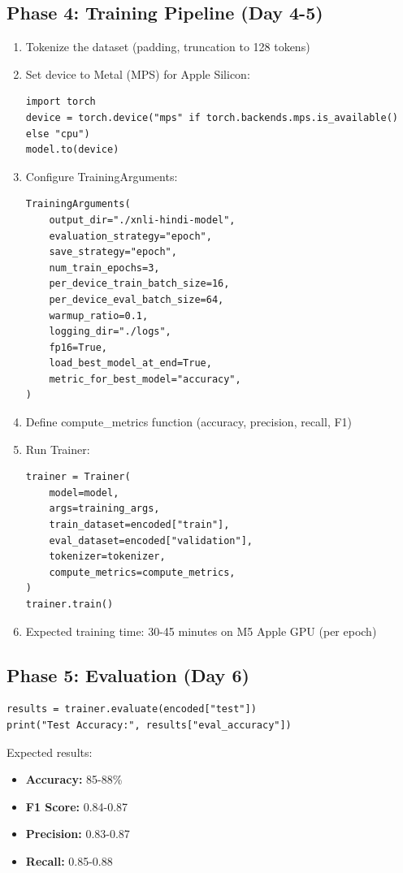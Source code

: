 \subsection{Phase 4: Training Pipeline (Day 4-5)}

\begin{enumerate}[nosep]
    \item Tokenize the dataset (padding, truncation to 128 tokens)
    \item Set device to Metal (MPS) for Apple Silicon:
\begin{verbatim}
import torch
device = torch.device("mps" if torch.backends.mps.is_available() else "cpu")
model.to(device)
\end{verbatim}
    \item Configure TrainingArguments:
\begin{verbatim}
TrainingArguments(
    output_dir="./xnli-hindi-model",
    evaluation_strategy="epoch",
    save_strategy="epoch",
    num_train_epochs=3,
    per_device_train_batch_size=16,
    per_device_eval_batch_size=64,
    warmup_ratio=0.1,
    logging_dir="./logs",
    fp16=True,
    load_best_model_at_end=True,
    metric_for_best_model="accuracy",
)
\end{verbatim}
    \item Define compute\_metrics function (accuracy, precision, recall, F1)
    \item Run Trainer:
\begin{verbatim}
trainer = Trainer(
    model=model,
    args=training_args,
    train_dataset=encoded["train"],
    eval_dataset=encoded["validation"],
    tokenizer=tokenizer,
    compute_metrics=compute_metrics,
)
trainer.train()
\end{verbatim}
    \item Expected training time: 30-45 minutes on M5 Apple GPU (per epoch)
\end{enumerate}

\subsection{Phase 5: Evaluation (Day 6)}

\begin{verbatim}
results = trainer.evaluate(encoded["test"])
print("Test Accuracy:", results["eval_accuracy"])
\end{verbatim}

Expected results:
\begin{itemize}[nosep]
    \item \textbf{Accuracy:} 85-88\%
    \item \textbf{F1 Score:} 0.84-0.87
    \item \textbf{Precision:} 0.83-0.87
    \item \textbf{Recall:} 0.85-0.88
\end{itemize}

